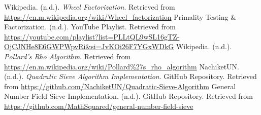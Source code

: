 \documentclass[12pt]{report}
\begin{document}
\begin{thebibliography}{99}
     Wikipedia. (n.d.). {\em Wheel Factorization}. Retrieved from \url{https://en.m.wikipedia.org/wiki/Wheel_factorization}
     Primality Testing \& Factorization. (n.d.). YouTube Playlist. Retrieved from \url{https://youtube.com/playlist?list=PLLtQL9wSL16gTZ-OjCJNHe8E6GWPWpvRi&si=JvKOi26F7YGxWDkG}
     Wikipedia. (n.d.). {\em Pollard's Rho Algorithm}. Retrieved from \url{https://en.m.wikipedia.org/wiki/Pollard%27s_rho_algorithm}
     NachiketUN. (n.d.). {\em Quadratic Sieve Algorithm Implementation}. GitHub Repository. Retrieved from \url{https://github.com/NachiketUN/Quadratic-Sieve-Algorithm}
     General Number Field Sieve Implementation. (n.d.). GitHub Repository. Retrieved from \url{https://github.com/MathSquared/general-number-field-sieve}
\end{thebibliography}
\end{document}
